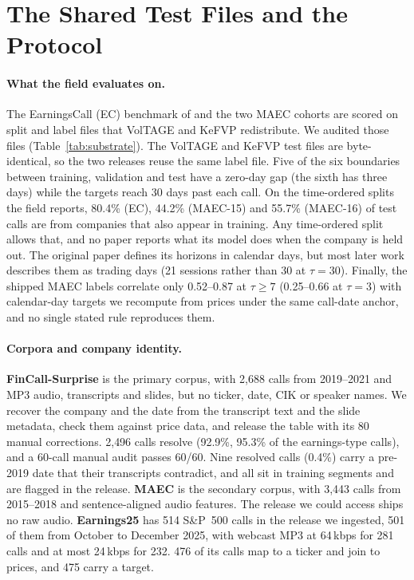\section{The Shared Test Files and the Protocol}
\label{sec:benchmark}

\paragraph{What the field evaluates on.}
\label{sec:substrate}
The EarningsCall (EC) benchmark of \citet{qin2019what} and the two MAEC cohorts
are scored on split and label files that VolTAGE and KeFVP redistribute. We
audited those files (Table~\ref{tab:substrate}). The VolTAGE and KeFVP test
files are byte-identical, so the two releases reuse the same label file. Five
of the six boundaries between training, validation and test have a zero-day gap (the sixth has three days)
while the targets reach 30 days past each call. On the time-ordered splits the field reports, 80.4\% (EC), 44.2\% (MAEC-15)
and 55.7\% (MAEC-16) of test calls are from companies that also appear in
training. Any time-ordered split allows that, and no paper reports what its
model does when the company is held out. The original paper defines its horizons in calendar
days, but most later work describes them as trading days (21 sessions rather than
30 at $\tau{=}30$). Finally, the shipped MAEC labels correlate only 0.52--0.87 at $\tau\ge7$
(0.25--0.66 at $\tau{=}3$) with calendar-day targets we recompute from prices
under the same call-date anchor, and no single stated rule reproduces them.



\paragraph{Corpora and company identity.}
\textbf{FinCall-Surprise} \citep{fincall2025} is the primary corpus, with 2{,}688
calls from 2019--2021 and MP3 audio, transcripts and slides, but no ticker, date,
CIK or speaker names. We recover the company and the date from the transcript
text and the slide metadata, check them against price data, and release the
table with its 80 manual corrections. 2{,}496 calls resolve (92.9\%, 95.3\% of
the earnings-type calls), and a 60-call manual audit passes 60/60. Nine resolved
calls (0.4\%) carry a pre-2019 date that their transcripts contradict, and all sit
in training segments and are flagged in the release. \textbf{MAEC}
\citep{li2020maec} is the secondary corpus, with 3{,}443 calls from 2015--2018 and sentence-aligned audio features. The release we
could access ships no raw audio.
\textbf{Earnings25} \citep{jiang2026earnings25} has 514 S\&P~500 calls in
the release we ingested, 501 of them from October to December 2025, with webcast
MP3 at 64\,kbps for 281 calls and at most 24\,kbps for 232. 476 of its calls map
to a ticker and join to prices, and 475 carry a target.

